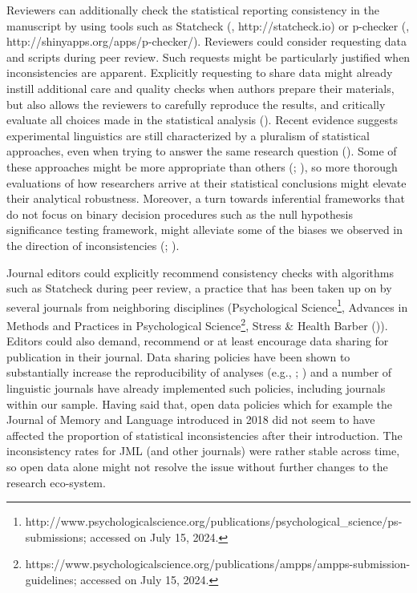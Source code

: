 \documentclass[
  doc,
  longtable,
  nolmodern,
  notxfonts,
  notimes,
  colorlinks=true,linkcolor=blue,citecolor=blue,urlcolor=blue]{apa7}
\begin{document}
Reviewers can additionally check the statistical reporting consistency
in the manuscript by using tools such as Statcheck
(,
http://statcheck.io) or p-checker
(,
http://shinyapps.org/apps/p-checker/). Reviewers could consider
requesting data and scripts during peer review. Such requests might be
particularly justified when inconsistencies are apparent. Explicitly
requesting to share data might already instill additional care and
quality checks when authors prepare their materials, but also allows the
reviewers to carefully reproduce the results, and critically evaluate
all choices made in the statistical analysis
(). Recent
evidence suggests experimental linguistics are still characterized by a
pluralism of statistical approaches, even when trying to answer the same
research question (). Some of these approaches might be more appropriate than
others (; ), so
more thorough evaluations of how researchers arrive at their statistical
conclusions might elevate their analytical robustness. Moreover, a turn
towards inferential frameworks that do not focus on binary decision
procedures such as the null hypothesis significance testing framework,
might alleviate some of the biases we observed in the direction of
inconsistencies (;
).

Journal editors could explicitly recommend consistency checks with
algorithms such as Statcheck during peer review, a practice that has
been taken up on by several journals from neighboring disciplines
(Psychological Science\footnote{http://www.psychologicalscience.org/publications/psychological\_science/ps-submissions;
  accessed on July 15, 2024.}, Advances in Methods and Practices in
Psychological Science\footnote{https://www.psychologicalscience.org/publications/ampps/ampps-submission-guidelines;
  accessed on July 15, 2024.}, Stress \& Health Barber
()). Editors could also demand,
recommend or at least encourage data sharing for publication in their
journal. Data sharing policies have been shown to substantially increase
the reproducibility of analyses (e.g.,
;
)
and a number of linguistic journals have already implemented such
policies, including journals within our sample. Having said that, open
data policies which for example the Journal of Memory and Language
introduced in 2018 did not seem to have affected the proportion of
statistical inconsistencies after their introduction. The inconsistency
rates for JML (and other journals) were rather stable across time, so
open data alone might not resolve the issue without further changes to
the research eco-system.
\end{document}
